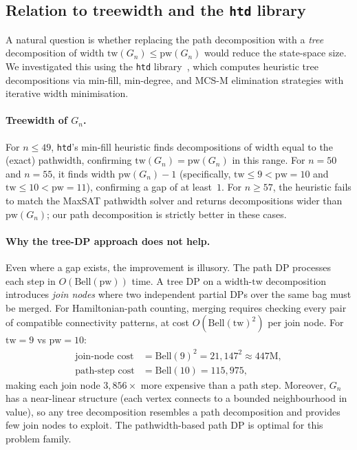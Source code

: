 \documentclass[12pt]{article}
\theoremstyle{definition}
\newcommand{\Gn}{G_n}
\newcommand{\pw}{\mathrm{pw}}
\newcommand{\tw}{\mathrm{tw}}
\newcommand{\Bell}{\mathrm{Bell}}
\begin{document}
\subsection{Relation to treewidth and the \texttt{htd} library}
\label{sec:treewidth}

A natural question is whether replacing the path decomposition with a
\emph{tree} decomposition of width $\tw(\Gn) \le \pw(\Gn)$ would
reduce the state-space size.
We investigated this using the \texttt{htd} library~\cite{htd},
which computes heuristic tree decompositions via min-fill, min-degree,
and MCS-M elimination strategies with iterative width minimisation.

\paragraph{Treewidth of $\Gn$.}
For $n \le 49$, \texttt{htd}'s min-fill heuristic finds decompositions
of width equal to the (exact) pathwidth, confirming $\tw(\Gn) =
\pw(\Gn)$ in this range.
For $n = 50$ and $n = 55$, it finds width $\pw(\Gn) - 1$
(specifically, $\tw \le 9 < \pw = 10$ and $\tw \le 10 < \pw = 11$),
confirming a gap of at least~$1$.
For $n \ge 57$, the heuristic fails to match the MaxSAT pathwidth
solver and returns decompositions wider than $\pw(\Gn)$; our path
decomposition is strictly better in these cases.

\paragraph{Why the tree-DP approach does not help.}
Even where a gap exists, the improvement is illusory.
The path DP processes each step in $O(\Bell(\pw))$ time.
A tree DP on a width-$\tw$ decomposition introduces \emph{join nodes}
where two independent partial DPs over the same bag must be merged.
For Hamiltonian-path counting, merging requires checking every pair of
compatible connectivity patterns, at cost $O(\Bell(\tw)^2)$ per join
node.
For $\tw = 9$ vs $\pw = 10$:
\begin{align*}
  \text{join-node cost} &= \Bell(9)^2 = 21{,}147^2 \approx 447\text{M}, \\
  \text{path-step cost} &= \Bell(10) = 115{,}975,
\end{align*}
making each join node $3{,}856\times$ more expensive than a path step.
Moreover, $\Gn$ has a near-linear structure (each vertex connects to a
bounded neighbourhood in value), so any tree decomposition resembles a
path decomposition and provides few join nodes to exploit.
The pathwidth-based path DP is optimal for this problem family.
\end{document}
